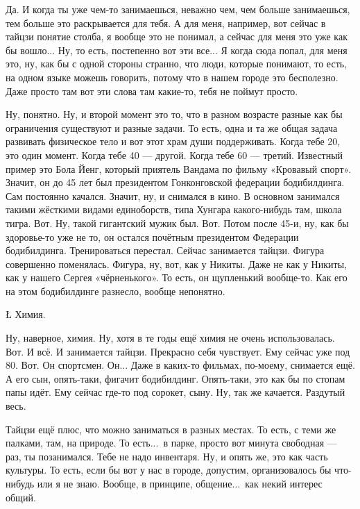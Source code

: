\I
Да. И когда ты уже
чем-то занимаешься, неважно чем,
чем больше занимаешься, тем больше
это раскрывается для тебя.
А для меня, например,
вот сейчас в тайцзи
понятие столба, я вообще
это не понимал, а сейчас для меня
это уже как бы вошло... Ну, то есть,
постепенно вот эти все...
Я когда сюда попал, для меня это,
ну, как бы с одной стороны странно,
что люди, которые
понимают, то есть, на
одном языке можешь говорить,
потому что в нашем городе это бесполезно.
Даже просто там вот эти слова
там какие-то, тебя не поймут просто.

\A
Ну, понятно.
Ну, и второй момент это то, что
в разном возрасте разные
как бы ограничения
существуют и разные задачи.
То есть, одна и та же
общая задача
развивать физическое
тело и вот этот храм души
поддерживать.
Когда тебе
20, это
один момент. Когда тебе 40 --- другой.
Когда тебе 60 --- третий.
Известный пример это
Бола Йенг, который
приятель
Вандама по фильму
«Кровавый спорт». Значит,
он до
45 лет
был президентом
Гонконговской федерации бодибилдинга.
Сам постоянно качался.
Значит,
ну, и снимался в кино.
В основном занимался
такими жёсткими видами
единоборств, типа Хунгара
какого-нибудь там, школа тигра.
Вот.
Ну, такой гигантский мужик был.
Вот. Потом
после 45-и,
ну, как бы здоровье-то уже не то,
он
остался почётным
президентом
Федерации бодибилдинга. Тренироваться
перестал. Сейчас
занимается тайцзи.
Фигура совершенно поменялась. Фигура,
ну, вот, как у Никиты.
Даже не как у Никиты,
как у нашего
Сергея «чёрненького».
То есть, он щупленький вообще-то.
Как его на этом бодибилдинге разнесло,
вообще непонятно.

\L
Химия.

\A
Ну, наверное,
химия. Ну, хотя в те годы
ещё химия не очень использовалась.
Вот. И всё. И занимается тайцзи.
Прекрасно себя чувствует. Ему сейчас уже
под 80. Вот. Он спортсмен.
Он... Даже в каких-то фильмах, по-моему, снимается ещё.
А его сын, опять-таки,
фигачит бодибилдинг.
Опять-таки, это как бы
по стопам папы идёт.
Ему сейчас где-то под
сорокет, сыну.
Ну, так же качается.
Раздутый весь.

\I
Тайцзи ещё плюс, что можно заниматься
в разных местах. То есть,
с теми же палками, там,
на природе. То есть...\
в парке, просто вот
минута свободная --- раз, ты позанимался.
Тебе не надо инвентаря.
Ну, и опять же, это как часть
культуры. То есть, если бы
вот у нас в городе, допустим,
организовалось бы что-нибудь или я не знаю.
Вообще, в принципе, общение...\
как некий интерес общий.

